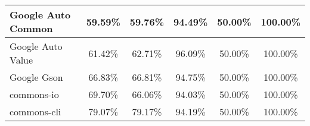 \documentclass[../../main]{subfiles}
\begin{document}
\begin{table}[!htb]
\begin{tabular}{|l|c|c|c|c|c|}
Google Auto Common            & 59.59\%                                                                                 & 59.76\%                                                                                     & 94.49\%                                                                              & 50.00\%                                                                               & 100.00\%                                                                             \\ \hline
Google Auto Value             & 61.42\%                                                                                 & 62.71\%                                                                                     & 96.09\%                                                                              & 50.00\%                                                                               & 100.00\%                                                                             \\ \hline
Google Gson                   & 66.83\%                                                                                 & 66.81\%                                                                                     & 94.75\%                                                                              & 50.00\%                                                                               & 100.00\%                                                                             \\ \hline
commons-io                    & 69.70\%                                                                                 & 66.06\%                                                                                     & 94.03\%                                                                              & 50.00\%                                                                               & 100.00\%                                                                             \\ \hline
commons-cli                   & 79.07\%                                                                                 & 79.17\%                                                                                     & 94.19\%                                                                              & 50.00\%                                                                               & 100.00\%                                                                             \\ \hline

\end{tabular}
\end{table}
\end{document}
